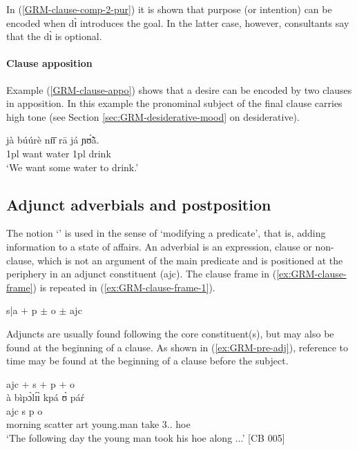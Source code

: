 \begin{exe}
\begin{exe}
  \z 
 \z
 
 In (\ref{GRM-clause-comp-2-pur}) it is shown that  purpose (or intention) can be encoded when {\sls dɪ̀} introduces the goal. In the latter case, however, consultants say that the  {\sls dɪ̀} is optional.


 \paragraph{Clause apposition}
 \label{GRM-dep-comp-clause}

Example (\ref{GRM-clause-appo}) shows that a desire can be encoded by two clauses in apposition. In this example the pronominal subject of the final clause carries high tone (see Section \ref{sec:GRM-desiderative-mood} on desiderative). 
 
 
 \begin{exe}
 \ex\label{GRM-clause-appo}
 \gll jà búúrè nɪ̄ɪ̄ rā já ɲʊ̃́ã̀.\\
{\sc 1pl} want water {\foc} {\sc 1pl} drink\\
 \glt  `We want some water to drink.' 
 \z



\subsection{Adjunct adverbials and postposition}
\label{sec:GRM-adverbial}

The notion `' is used in the sense of  `modifying a predicate', that is, adding  information to  a state of affairs. An adverbial is an expression, clause or non-clause, which is not an argument of  the main predicate and is positioned at the periphery in an adjunct constituent  ({\sc ajc}). The clause frame in (\ref{ex:GRM-clause-frame}) is repeated in (\ref{ex:GRM-clause-frame-1}). 

\begin{exe}
\ex\label{ex:GRM-clause-frame-1}
 {\sc s|a}  $+$ {\sc p} $\pm$ {\sc o} $\pm$ {\sc ajc} 
\end{exe}

Adjuncts are usually found following the core constituent(s), but may also be found at the beginning of a clause. As shown in (\ref{ex:GRM-pre-adj}), reference to time may be found at the beginning of a clause before the subject.


\ea\label{ex:GRM-pre-adj}
{{\sc ajc} $+$ {\sc s}  $+$ {\sc p}  $+$  {\sc o}}\\
   {à bìpɔ̀lɪ́ɪ̀}  kpá {ʊ̀ páŕ}\\
 {\sc ajc}  {\sc s}  {\sc p} {\sc o}\\
{morning   scatter}   {{\sc art} young.man} take {{3.\sg.\poss} hoe}\\
  \glt  `The following day the young man took his hoe along ...' [CB 005]
\z


\end{exe}
\end{exe}
\end{exe}
